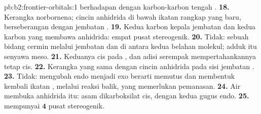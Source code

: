 \begin{solution}{pb:b2:frontier-orbitals:1}
berhadapan dengan karbon-karbon tengah  .
\textbf{18.} Kerangka norbornena; cincin anhidrida di bawah ikatan rangkap
yang baru, berseberangan dengan jembatan .
\textbf{19.} Kedua karbon kepala jembatan dan kedua karbon yang membawa
anhidrida: empat pusat stereogenik.
\textbf{20.} Tidak: sebuah bidang cermin melalui jembatan  dan di
antara kedua belahan molekul; adduk itu senyawa meso.
\textbf{21.} Keduanya cis pada , dan adisi serempak mempertahankannya
tetap cis.
\textbf{22.} Kerangka yang sama dengan cincin anhidrida pada sisi jembatan
.
\textbf{23.} Tidak: mengubah endo menjadi exo berarti memutus dan membentuk
kembali ikatan , melalui reaksi balik, yang memerlukan pemanasan.
\textbf{24.} Air membuka anhidrida itu: asam dikarboksilat cis, dengan kedua
gugus  endo.
\textbf{25.}  mempunyai $\boldsymbol{4}$ pusat stereogenik.
\end{solution}
